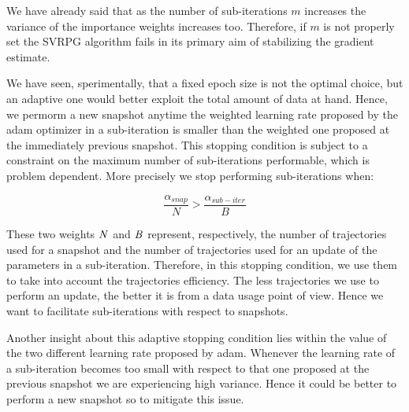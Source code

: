 \documentclass{article}
\theoremstyle{remark}
\theoremstyle{definition}
\begin{document}

We have already said that as the number of sub-iterations $m$ increases the variance of the importance weights increases too. Therefore, if $m$ is not properly set the SVRPG algorithm fails in its primary aim of stabilizing the gradient estimate.

We have seen, sperimentally, that a fixed epoch size is not the optimal choice, but an adaptive one would better exploit the total amount of data at hand. Hence, we permorm a new snapshot anytime the weighted learning rate proposed by the adam optimizer in a sub-iteration is smaller than the weighted one proposed at the immediately previous snapshot. This stopping condition is subject to a constraint on the maximum number of sub-iterations performable, which is problem dependent.
More precisely we stop performing sub-iterations when:

\[\frac{\alpha_{snap}}{N}>\frac{\alpha_{sub-iter}}{B}\]

These two weights ${\bf{\it N}}$ and ${\bf{\it B}}$ represent, respectively, the number of trajectories used for a snapshot and the number of trajectories used for an update of the parameters in a sub-iteration. Therefore, in this stopping condition, we use them to take into account the trajectories efficiency. The less trajectories we use to perform an update, the better it is from a data usage point of view. Hence we want to facilitate sub-iterations with respect to snapshots.

Another insight about this adaptive stopping condition lies within the value of the two different learning rate proposed by adam. Whenever the learning rate of a sub-iteration becomes too small with respect to that one proposed at the previous snapshot we are experiencing high variance. Hence it could be better to perform a new snapshot so to mitigate this issue.
\end{document}
